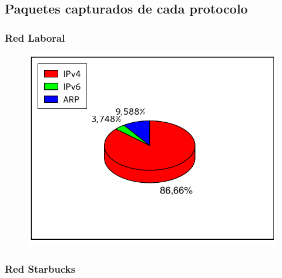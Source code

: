 
\FloatBarrier
\subsection{Paquetes capturados de cada protocolo}


\FloatBarrier
\subsubsection{Red Laboral}

\begin{figure}[h!]
  \begin{center}
    \includegraphics{graficos/protocolos-baufest.pdf}
	\caption{}
    \label{fig:proto-baufest}  
  \end{center}
\end{figure}


\FloatBarrier
\subsubsection{Red Starbucks}

